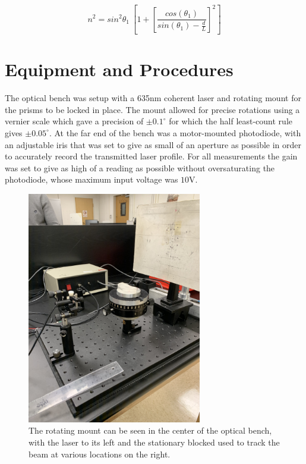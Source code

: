 \documentclass[colorlinks=true,pdfstartview=FitV,linkcolor=blue,
            citecolor=red,urlcolor=magenta]{basedoc}
\begin{document}
  \begin{equation} \label{eq:ind_refr_ang_refr}
      n^2 = sin^2 \theta_1 \ [1 + \left[ \frac {cos(\theta_1)} {sin(\theta_1) - \frac{d}{L} } \right] ^2 ]
  \end{equation}


\pagebreak
\section{Equipment and Procedures}
  The optical bench was setup with a 635nm coherent laser and rotating mount for the prisms to be locked in place. The mount allowed for precise rotations using a vernier scale which gave a precision of $\pm0.1^{\circ}$ for which the half least-count rule gives $\pm0.05^{\circ}$. At the far end of the bench was a motor-mounted photodiode, with an adjustable iris that was set to give as small of an aperture as possible in order to accurately record the transmitted laser profile. For all measurements the gain was set to give as high of a reading as possible without oversaturating the photodiode, whose maximum input voltage was $10$V.

    \begin{figure}[!h]
      \begin{center}
      \includegraphics[angle=270,width=3in]{resources/prism_mount.jpeg}
      \caption{The rotating mount can be seen in the center of the optical bench, with the laser to its left and the stationary blocked used to track the beam at various locations on the right.}
      \label{fig:prism_mount}
      \end{center}
    \end{figure}
\end{document}
